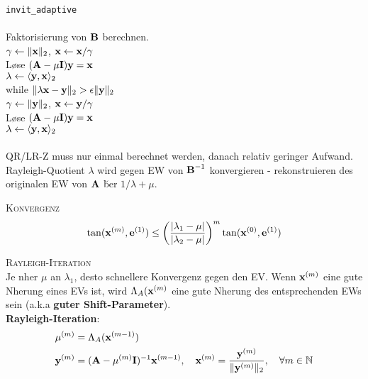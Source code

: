 \verb!invit_adaptive!\\
{\addtolength{\leftskip}{0mm}
\hrulefill\\
Faktorisierung von $\mbox{\bf B}$ berechnen. \\
$\gamma \leftarrow \Vert \mbox{\bf x} \Vert_2$, $\mbox{\bf x} \leftarrow \mbox{\bf x}/\gamma$ \\
L\o se $(\mbox{\bf A}-\mu \mbox{\bf I})\mbox{\bf y} = \mbox{\bf x}$\\
$\lambda \leftarrow \langle \mbox{\bf y},\mbox{\bf x} \rangle_2$\\
while $\Vert \lambda\mbox{\bf x} - \mbox{\bf y} \Vert_2 > \epsilon \Vert \mbox{\bf y} \Vert_2$ \\ 
\quad $\gamma \leftarrow \Vert \mbox{\bf y} \Vert_2$, $\mbox{\bf x} \leftarrow \mbox{\bf y}/\gamma$ \\
\quad L\o se $(\mbox{\bf A}-\mu \mbox{\bf I})\mbox{\bf y} = \mbox{\bf x}$\\
\quad $\lambda \leftarrow \langle \mbox{\bf y},\mbox{\bf x} \rangle_2$\\
\hrulefill\\
}
QR/LR-Z muss nur einmal berechnet werden, danach relativ geringer Aufwand.
Rayleigh-Quotient $\lambda$ wird gegen EW von $\mbox{\bf B}^{-1}$ konvergieren - rekonstruieren des originalen EW von $\mbox{\bf A}$ \u ber $1/\lambda +\mu$. \vspace{0.2cm}

\textsc{Konvergenz}
\begin{align*}
\tan(\mbox{\bf x}^{(m)}, \mbox{\bf e}^{(1)}) \leq \left( \frac{|\lambda_1 - \mu |}{|\lambda_2 - \mu|}\right)^m \tan (\mbox{\bf x}^{(0)}, \mbox{\bf e}^{(1)})
\end{align*} \vspace{0.2cm}

\textsc{Rayleigh-Iteration}\\
Je n\a her $\mu$ an $\lambda_1$, desto schnellere Konvergenz gegen den EV. Wenn $\mbox{\bf x}^{(m)}$ eine gute N\a herung eines EVs ist, wird $\Lambda_A(\mbox{\bf x}^{(m)}$ eine gute N\a herung des entsprechenden EWs sein (a.k.a \textbf{guter Shift-Parameter}).\\
\textbf{Rayleigh-Iteration}:
\begin{align*}
\mu^{(m)} &= \Lambda_A(\mbox{\bf x}^{(m-1)}) \\
\mbox{\bf y}^{(m)} &= (\mbox{\bf A} - \mu^{(m)}\mbox{\bf I})^{-1} \mbox{\bf x}^{(m-1)}, \quad \mbox{\bf x}^{(m)} = \frac{\mbox{\bf y}^{(m)}}{\Vert \mbox{\bf y}^{(m)} \Vert_2}, \quad \forall m\in \mathbb{N}
\end{align*}


